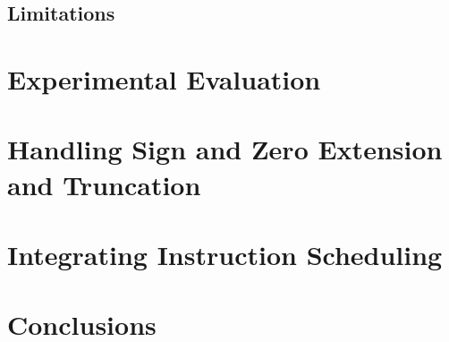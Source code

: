 \documentclass{book}
\begin{document}
\section{Limitations}

\chapter{Experimental Evaluation}

\chapter{Handling Sign and Zero Extension and Truncation}

\chapter{Integrating Instruction Scheduling}

\chapter{Conclusions}
\end{document}
